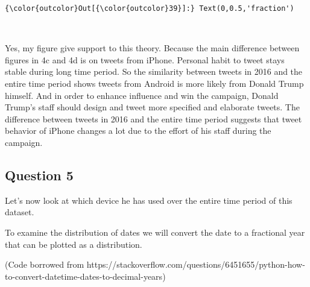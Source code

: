 \documentclass[11pt]{article}
\begin{document}
\begin{Verbatim}[commandchars=\\\{\}]
{\color{outcolor}Out[{\color{outcolor}39}]:} Text(0,0.5,'fraction')
\end{Verbatim}
            
    \begin{center}
    \end{center}
    { \hspace*{\fill} \\}
    
    Yes, my figure give support to this theory. Because the main difference
between figures in 4c and 4d is on tweets from iPhone. Personal habit to
tweet stays stable during long time period. So the similarity between
tweets in 2016 and the entire time period shows tweets from Android is
more likely from Donald Trump himself. And in order to enhance influence
and win the campaign, Donald Trump's staff should design and tweet more
specified and elaborate tweets. The difference between tweets in 2016
and the entire time period suggests that tweet behavior of iPhone
changes a lot due to the effort of his staff during the campaign.

    \subsection{Question 5}\label{question-5}

Let's now look at which device he has used over the entire time period
of this dataset.

To examine the distribution of dates we will convert the date to a
fractional year that can be plotted as a distribution.

(Code borrowed from
https://stackoverflow.com/questions/6451655/python-how-to-convert-datetime-dates-to-decimal-years)
\end{document}
